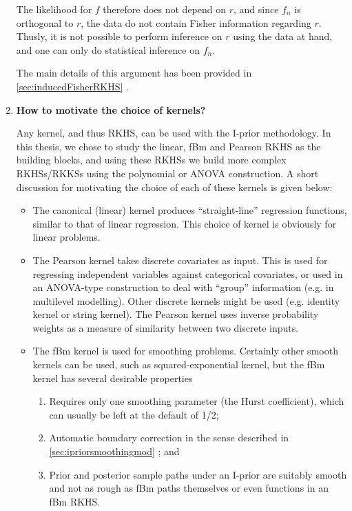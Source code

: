 \documentclass[11pt,openright,twoside]{report}
\begin{document}
\begin{enumerate}
  The likelihood for $f$ therefore does not depend on $r$, and since $f_n$ is orthogonal to $r$, the data do not contain Fisher information regarding $r$.
  Thusly, it is not possible to perform inference on $r$ using the data at hand, and one can only do statistical inference on $f_n$.
  
  The main details of this argument has been provided in \cref{sec:inducedFisherRKHS} .
  
  \item \textbf{How to motivate the choice of kernels?}
  
  Any kernel, and thus RKHS, can be used with the I-prior methodology.
  In this thesis, we chose to study the linear, fBm and Pearson RKHS as the building blocks, and using these RKHSs we build more complex RKHSs/RKKSs using the polynomial or ANOVA construction.
  A short discussion for motivating the choice of each of these kernels is given below:
  \begin{itemize}
    \item The canonical (linear) kernel produces ``straight-line'' regression functions, similar to that of linear regression. This choice of kernel is obviously for linear problems.
    \item The Pearson kernel takes discrete covariates as input. This is used for regressing independent variables against categorical covariates, or used in an ANOVA-type construction to deal with ``group'' information (e.g. in multilevel modelling). Other discrete kernels might be used (e.g. identity kernel or string kernel). The Pearson kernel uses inverse probability weights as a measure of similarity between two discrete inputs.
    \item The fBm kernel is used for smoothing problems. Certainly other smooth kernels can be used, such as squared-exponential kernel, but the fBm kernel has several desirable properties
    \begin{enumerate}
      \item Requires only one smoothing parameter (the Hurst coefficient), which can usually be left at the default of 1/2; 
      \item Automatic boundary correction in the sense described in \cref{sec:ipriorsmoothingmod} ; and 
      \item Prior and posterior sample paths under an I-prior are suitably smooth and not as rough as fBm paths themselves or even functions in an fBm RKHS.
    \end{enumerate}
  \end{itemize}
  

\end{enumerate}
\end{document}
